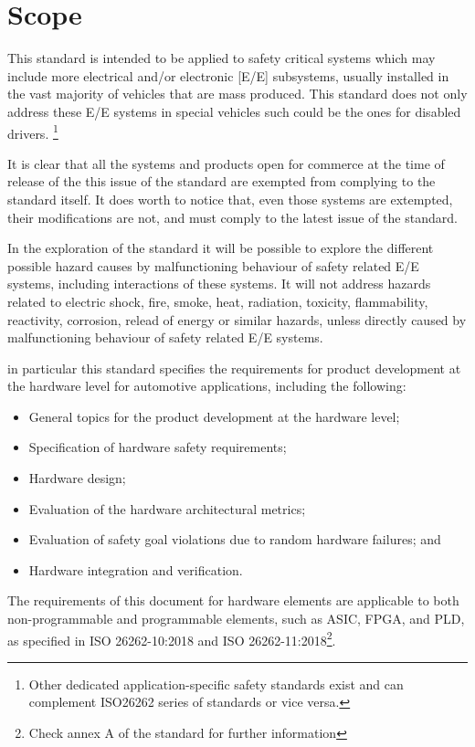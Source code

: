 \documentclass[./dissertation.tex]{subfiles}
\begin{document}
\section{Scope}
This standard is intended to be applied to safety critical systems which may include more electrical and/or electronic [E/E] subsystems, usually installed in the vast majority of vehicles that are mass produced. This standard does not only address these E/E systems in special vehicles such could be the ones for disabled drivers. \footnote{ Other dedicated application-specific safety standards exist and can complement ISO26262 series of standards or vice versa.}

It is clear that all the systems and products open for commerce at the time of release of the this issue of the standard are exempted from complying to the standard itself. It does worth to notice that, even those systems are extempted, their modifications are not, and must comply to the latest issue of the standard.

In the exploration of the standard it will be possible to explore the different possible hazard causes by malfunctioning behaviour of safety related E/E systems, including interactions of these systems. It will not address hazards related to electric shock, fire, smoke, heat, radiation, toxicity, flammability, reactivity, corrosion, relead of energy or similar hazards, unless directly caused by malfunctioning behaviour of safety related E/E systems.

in particular this standard specifies the requirements for product development at the hardware level for automotive applications, including the following:
\begin{itemize}
\item General topics for the product development at the hardware level;
\item Specification of hardware safety requirements;
\item Hardware design;
\item Evaluation of the hardware architectural metrics;
\item Evaluation of safety goal violations due to random hardware failures; and
\item Hardware integration and verification.
\end{itemize}
The requirements of this document for hardware elements are applicable to both non-programmable and programmable elements, such as ASIC, FPGA, and PLD, as specified in ISO 26262-10:2018 and ISO 26262-11:2018\footnote{Check annex A of the standard for further information}.
\end{document}
